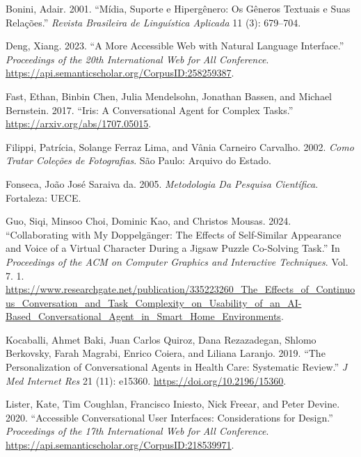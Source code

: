 \documentclass[
]{article}
\newlength{\cslhangindent}
\newenvironment{CSLReferences}[2] %
 {\begin{list}{}{%
  \setlength{\itemindent}{0pt}
  \setlength{\leftmargin}{0pt}
  \setlength{\parsep}{0pt}
  \ifodd #1
   \setlength{\leftmargin}{\cslhangindent}
   \setlength{\itemindent}{-1\cslhangindent}
  \fi
  \setlength{\itemsep}{#2\baselineskip}}}
 {\end{list}}
\begin{document}
\label{refs}
\begin{CSLReferences}{1}{0}
Bonini, Adair. 2001. {``Mídia, Suporte e Hipergênero: Os Gêneros
Textuais e Suas Relações.''} \emph{Revista Brasileira de Linguística
Aplicada} 11 (3): 679--704.

Deng, Xiang. 2023. {``A More Accessible Web with Natural Language
Interface.''} \emph{Proceedings of the 20th International Web for All
Conference}. \url{https://api.semanticscholar.org/CorpusID:258259387}.

Fast, Ethan, Binbin Chen, Julia Mendelsohn, Jonathan Bassen, and Michael
Bernstein. 2017. {``Iris: A Conversational Agent for Complex Tasks.''}
\url{https://arxiv.org/abs/1707.05015}.

Filippi, Patrícia, Solange Ferraz Lima, and Vânia Carneiro Carvalho.
2002. \emph{Como Tratar Coleções de Fotografias}. São Paulo: Arquivo do
Estado.

Fonseca, João José Saraiva da. 2005. \emph{Metodologia Da Pesquisa
Científica}. Fortaleza: UECE.

Guo, Siqi, Minsoo Choi, Dominic Kao, and Christos Mousas. 2024.
{``Collaborating with My Doppelgänger: The Effects of Self-Similar
Appearance and Voice of a Virtual Character During a Jigsaw Puzzle
Co-Solving Task.''} In \emph{Proceedings of the ACM on Computer Graphics
and Interactive Techniques}. Vol. 7. 1.
\url{https://www.researchgate.net/publication/335223260_The_Effects_of_Continuous_Conversation_and_Task_Complexity_on_Usability_of_an_AI-Based_Conversational_Agent_in_Smart_Home_Environments}.

Kocaballi, Ahmet Baki, Juan Carlos Quiroz, Dana Rezazadegan, Shlomo
Berkovsky, Farah Magrabi, Enrico Coiera, and Liliana Laranjo. 2019.
{``The Personalization of Conversational Agents in Health Care:
Systematic Review.''} \emph{J Med Internet Res} 21 (11): e15360.
\url{https://doi.org/10.2196/15360}.

Lister, Kate, Tim Coughlan, Francisco Iniesto, Nick Freear, and Peter
Devine. 2020. {``Accessible Conversational User Interfaces:
Considerations for Design.''} \emph{Proceedings of the 17th
International Web for All Conference}.
\url{https://api.semanticscholar.org/CorpusID:218539971}.


\end{CSLReferences}
\end{document}
